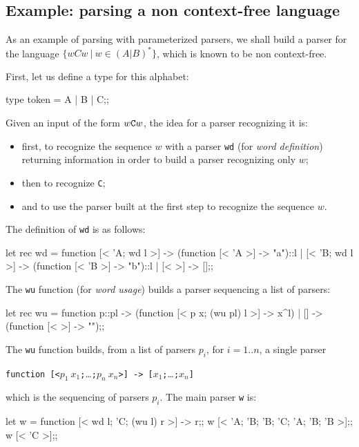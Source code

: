 \subsection{Example: parsing a non context-free language}

As an example of parsing with parameterized parsers, we shall build
a parser for the language $\{wCw~ |~ w \in (A|B)^{*} \}$, which is
known to be non context-free.

First, let us define a type for this alphabet:
\begin{caml_example}
type token = A | B | C;;
\end{caml_example}
Given an input of the form $w {\tt C} w$, the idea for a parser
recognizing it is:
\begin{itemize}
\item first, to recognize the sequence $w$ with a parser {\tt wd} (for
{\em word definition}) returning information in order to build a
parser recognizing only $w$;
\item then to recognize {\tt C};
\item and to use the parser built at the first step to recognize the
sequence $w$.
\end{itemize}
The definition of {\tt wd} is as follows:
\begin{caml_example}
let rec wd = function
  [< 'A; wd l >] -> (function [< 'A >] -> "a")::l
| [< 'B; wd l >] -> (function [< 'B >] -> "b")::l
| [< >] -> [];;
\end{caml_example}
The {\tt wu} function (for {\em word usage}) builds a parser
sequencing a list of parsers:
\begin{caml_example}
let rec wu = function
  p::pl -> (function [< p x; (wu pl) l >] -> x^l)
| [] -> (function [< >] -> "");;
\end{caml_example}
The {\tt wu} function builds, from a list of parsers $p_i$, for
$i=1..n$, a single parser
\begin{center}
\verb|function [<|$p_1~x_1${\tt;}\ldots{\tt;}$p_n~x_n$\verb|>] -> [|$x_1${\tt;}\ldots{\tt;}$x_n$\verb|]|
\end{center}
which is the sequencing of parsers $p_i$.
The main parser {\tt w} is:
\begin{caml_example}
let w = function [< wd l; 'C; (wu l) r >] -> r;;
w [< 'A; 'B; 'B; 'C; 'A; 'B; 'B >];;
w [< 'C >];;
\end{caml_example}

